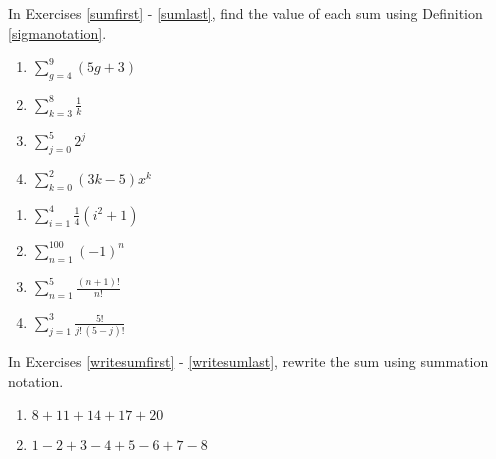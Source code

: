 \documentclass{ximera}
\begin{document}
	\author{Stitz-Zeager}


In Exercises \ref{sumfirst} - \ref{sumlast}, find the value of each sum using Definition \ref{sigmanotation}.

\begin{multicols}{4} 
\begin{enumerate}

\item $\displaystyle \sum_{g = 4}^{9} (5g + 3)$  \label{sumfirst}
\item $\displaystyle \sum_{k = 3}^{8} \frac{1}{k}$
\item $\displaystyle \sum_{j = 0}^{5} 2^{j}$
\item $\displaystyle \sum_{k = 0}^{2} (3k - 5)x^{k}$

\setcounter{HW}{\value{enumi}}
\end{enumerate}
\end{multicols}

\begin{multicols}{4}
\begin{enumerate}
\setcounter{enumi}{\value{HW}}

\item $\displaystyle \sum_{i = 1}^{4} \frac{1}{4}(i^{2} + 1)$
\item $\displaystyle \sum_{n = 1}^{100} (-1)^{n}$
\item $\displaystyle \sum_{n = 1}^{5} \frac{(n+1)!}{n!}$
\item $\displaystyle \sum_{j = 1}^{3} \frac{5!}{j! \, (5-j)!}$  \label{sumlast}

\setcounter{HW}{\value{enumi}}
\end{enumerate}
\end{multicols}

In Exercises \ref{writesumfirst} - \ref{writesumlast},  rewrite the sum using summation notation.


\begin{multicols}{2}
\begin{enumerate}
\setcounter{enumi}{\value{HW}}

\item $8 + 11 + 14 + 17 + 20$  \label{writesumfirst}
\item $1 - 2 + 3 - 4 + 5 - 6 + 7 - 8$

\setcounter{HW}{\value{enumi}}
\end{enumerate}
\end{multicols}
\end{document}
